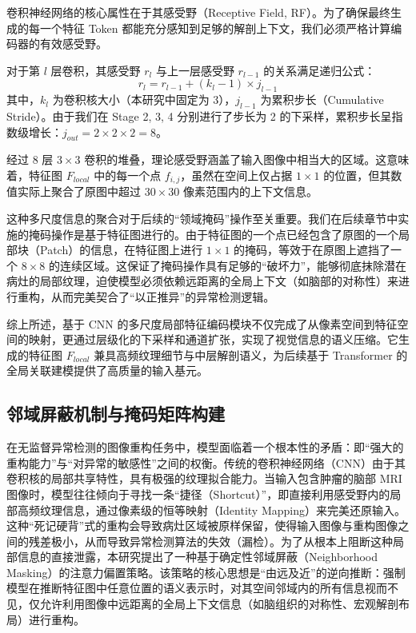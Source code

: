 \documentclass[Win]{xjtuBSThesis}  %
\begin{document}
卷积神经网络的核心属性在于其感受野（Receptive Field, RF）。为了确保最终生成的每一个特征 Token 都能充分感知到足够的解剖上下文，我们必须严格计算编码器的有效感受野。

对于第 $l$ 层卷积，其感受野 $r_l$ 与上一层感受野 $r_{l-1}$ 的关系满足递归公式：
\begin{equation}
    r_l = r_{l-1} + (k_l - 1) \times j_{l-1}
\end{equation}
其中，$k_l$ 为卷积核大小（本研究中固定为 3），$j_{l-1}$ 为累积步长（Cumulative Stride）。由于我们在 Stage 2, 3, 4 分别进行了步长为 2 的下采样，累积步长呈指数级增长：$j_{out} = 2 \times 2 \times 2 = 8$。

经过 8 层 $3 \times 3$ 卷积的堆叠，理论感受野涵盖了输入图像中相当大的区域。这意味着，特征图 $F_{local}$ 中的每一个点 $f_{i,j}$，虽然在空间上仅占据 $1 \times 1$ 的位置，但其数值实际上聚合了原图中超过 $30 \times 30$ 像素范围内的上下文信息。

这种多尺度信息的聚合对于后续的“领域掩码”操作至关重要。我们在后续章节中实施的掩码操作是基于特征图进行的。由于特征图的一个点已经包含了原图的一个局部块（Patch）的信息，在特征图上进行 $1 \times 1$ 的掩码，等效于在原图上遮挡了一个 $8 \times 8$ 的连续区域。这保证了掩码操作具有足够的“破坏力”，能够彻底抹除潜在病灶的局部纹理，迫使模型必须依赖远距离的全局上下文（如脑部的对称性）来进行重构，从而完美契合了“以正推异”的异常检测逻辑。

综上所述，基于 CNN 的多尺度局部特征编码模块不仅完成了从像素空间到特征空间的映射，更通过层级化的下采样和通道扩张，实现了视觉信息的语义压缩。它生成的特征图 $F_{local}$ 兼具高频纹理细节与中层解剖语义，为后续基于 Transformer 的全局关联建模提供了高质量的输入基元。




\subsection{邻域屏蔽机制与掩码矩阵构建}
\label{subsec:neighbor_mask}

在无监督异常检测的图像重构任务中，模型面临着一个根本性的矛盾：即“强大的重构能力”与“对异常的敏感性”之间的权衡。传统的卷积神经网络（CNN）由于其卷积核的局部共享特性，具有极强的纹理拟合能力。当输入包含肿瘤的脑部 MRI 图像时，模型往往倾向于寻找一条“捷径（Shortcut）”，即直接利用感受野内的局部高频纹理信息，通过像素级的恒等映射（Identity Mapping）来完美还原输入。这种“死记硬背”式的重构会导致病灶区域被原样保留，使得输入图像与重构图像之间的残差极小，从而导致异常检测算法的失效（漏检）。为了从根本上阻断这种局部信息的直接泄露，本研究提出了一种基于确定性邻域屏蔽（Neighborhood Masking）的注意力偏置策略。该策略的核心思想是“由远及近”的逆向推断：强制模型在推断特征图中任意位置的语义表示时，对其空间邻域内的所有信息视而不见，仅允许利用图像中远距离的全局上下文信息（如脑组织的对称性、宏观解剖布局）进行重构。
\end{document}
